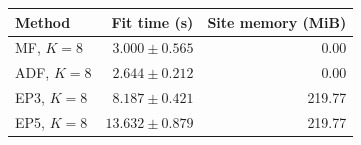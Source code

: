 \begin{tabular}{@{}lrr@{}}
\toprule
Method & Fit time (s) & Site memory (MiB) \\
\midrule
MF, $K=8$ & $3.000\pm0.565$ & 0.00 \\
ADF, $K=8$ & $2.644\pm0.212$ & 0.00 \\
EP3, $K=8$ & $8.187\pm0.421$ & 219.77 \\
EP5, $K=8$ & $13.632\pm0.879$ & 219.77 \\
\bottomrule
\end{tabular}
